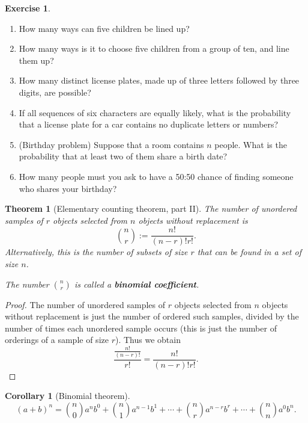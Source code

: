 \documentclass[a4paper,leqno]{article}
\numberwithin{equation}{section}
\newtheorem{thm}[equation]{Theorem}
\newtheorem{cor}[equation]{Corollary}
\theoremstyle{definition}
\newtheorem{exercise}[equation]{Exercise}
\theoremstyle{remark}
\newcommand{\df}{\textbf}
\begin{document}
\begin{exercise}\leavevmode
  \begin{enumerate}
    \item How many ways can five children be lined up?
    \item How many ways is it to choose five children from a group of ten, and line them up?
    \item How many distinct license plates, made up of three letters followed by three digits, are possible?
    \item If all sequences of six characters are equally likely, what is the probability that a license
          plate for a car contains no duplicate letters or numbers?
    \item (Birthday problem) Suppose that a room contains $ n $ people. What is the probability that at least two of them share a birth date?
    \item How many people must you ask to have a 50:50 chance of finding someone who shares your birthday?
  \end{enumerate}
\end{exercise}

\begin{thm}[Elementary counting theorem, part II]
  The number of unordered samples of $ r $ objects selected from $ n $ objects without replacement is
  \begin{displaymath}
    \binom{n}{r} := \frac{n!}{(n - r)!r!}.
  \end{displaymath}
  Alternatively, this is the number of subsets of size $ r $ that can be found in a set of size $ n $.

  The number $ \binom{n}{r} $ is called a \df{binomial coefficient}.
\end{thm}
\begin{proof}
  The number of unordered samples of $ r $ objects selected from $ n $ objects without replacement is just
  the number of ordered such samples, divided by the number of times each unordered sample occurs (this is just
  the number of orderings of a sample of size $ r $). Thus we obtain
  \begin{displaymath}
    \frac{\frac{n!}{(n - r)!}}{r!} = \frac{n!}{(n - r)!r!}.
  \end{displaymath}
\end{proof}

\begin{cor}[Binomial theorem]
  \begin{displaymath}
    (a + b)^n = \binom{n}{0} a^n b^{0} + \binom{n}{1} a^{n - 1} b^{1} + \cdots + \binom{n}{r} a^{n - r} b^r + \cdots + \binom{n}{n} a^{0} b^n.
  \end{displaymath}
\end{cor}
\end{document}
